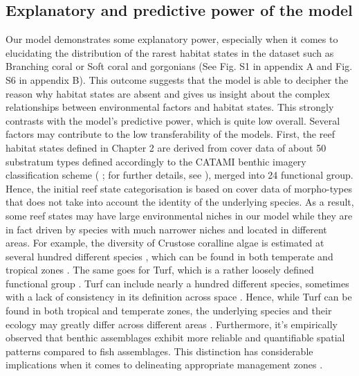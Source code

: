 \begin{refsection}
\hypertarget{explanatory-and-predictive-power-of-the-model}{%
\subsection{Explanatory and predictive power of the
model}\label{explanatory-and-predictive-power-of-the-model}}

Our model demonstrates some explanatory power, especially when it comes
to elucidating the distribution of the rarest habitat states in the
dataset such as Branching coral or Soft coral and gorgonians (See Fig.
S1 in appendix A and Fig. S6 in appendix B). This outcome suggests that
the model is able to decipher the reason why habitat states are absent
and gives us insight about the complex relationships between
environmental factors and habitat states. This strongly contrasts with
the model's predictive power, which is quite low overall. Several
factors may contribute to the low transferability of the models. First,
the reef habitat states defined in Chapter 2 are derived from cover data
of about 50 substratum types defined accordingly to the CATAMI benthic
imagery classification scheme (\textcite{Althaus_2015} ; for further
details, see \textcite{Edgar_2020}), merged into 24 functional group.
Hence, the initial reef state categorisation is based on cover data of
morpho-types that does not take into account the identity of the
underlying species. As a result, some reef states may have large
environmental niches in our model while they are in fact driven by
species with much narrower niches and located in different areas. For
example, the diversity of Crustose coralline algae is estimated at
several hundred different species \autocite{Dean_2015,Twist_2019}, which
can be found in both temperate and tropical zones
\autocite{Sissini_2022}. The same goes for Turf, which is a rather
loosely defined functional group \autocite{Connell_2014}. Turf can
include nearly a hundred different species, sometimes with a lack of
consistency in its definition across space \autocite{Connell_2014}.
Hence, while Turf can be found in both tropical and temperate zones, the
underlying species and their ecology may greatly differ across different
areas \autocite{Filbee-Dexter_2018}. Furthermore, it's empirically
observed that benthic assemblages exhibit more reliable and quantifiable
spatial patterns compared to fish assemblages. This distinction has
considerable implications when it comes to delineating appropriate
management zones \autocite{Sandin_2022}.


\end{refsection}
